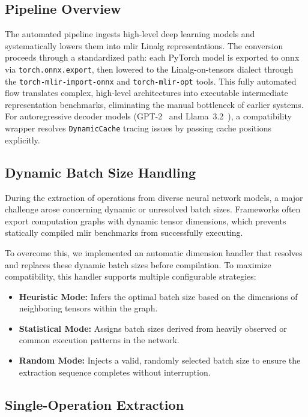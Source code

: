 \newpage
\subsection{Pipeline Overview}
The automated pipeline ingests high-level deep learning models and systematically lowers them into \gls{mlir} Linalg representations. The conversion proceeds through a standardized path: each PyTorch model is exported to \gls{onnx} via \texttt{torch.onnx.export}, then lowered to the Linalg-on-tensors dialect through the \texttt{torch-mlir-import-onnx} and \texttt{torch-mlir-opt} tools. This fully automated flow translates complex, high-level architectures into executable intermediate representation benchmarks, eliminating the manual bottleneck of earlier systems. For autoregressive decoder models (GPT-2~\cite{radford2019gpt2} and Llama~3.2~\cite{llamateam2024llama3}), a compatibility wrapper resolves \texttt{DynamicCache} tracing issues by passing cache positions explicitly.

\subsection{Dynamic Batch Size Handling}
During the extraction of operations from diverse neural network models, a major challenge arose concerning dynamic or unresolved batch sizes. Frameworks often export computation graphs with dynamic tensor dimensions, which prevents statically compiled \gls{mlir} benchmarks from successfully executing.

To overcome this, we implemented an automatic dimension handler that resolves and replaces these dynamic batch sizes before compilation. To maximize compatibility, this handler supports multiple configurable strategies:
\begin{itemize}
    \item \textbf{Heuristic Mode:} Infers the optimal batch size based on the dimensions of neighboring tensors within the graph.
    \item \textbf{Statistical Mode:} Assigns batch sizes derived from heavily observed or common execution patterns in the network.
    \item \textbf{Random Mode:} Injects a valid, randomly selected batch size to ensure the extraction sequence completes without interruption.
\end{itemize}

\subsection{Single-Operation Extraction}

